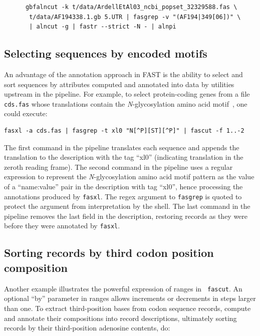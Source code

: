\documentclass{frontiersSCNS} %
\begin{document}
\begin{verbatim}
      gbfalncut -k t/data/ArdellEtAl03_ncbi_popset_32329588.fas \
       t/data/AF194338.1.gb 5.UTR | fasgrep -v "(AF194|349[06])" \
       | alncut -g | fastr --strict -N - | alnpi
\end{verbatim}

\subsection{Selecting sequences by encoded motifs }

An advantage of the annotation approach in FAST is the ability to
select and sort sequences by attributes computed and annotated into
data by utilities upstream in the pipeline. For example, to select
protein-coding genes from a file {\tt cds.fas} whose translations
contain the {\it N}-glycosylation amino acid
motif~\citep{KornfieldKornfield85}, one could execute:

\begin{verbatim}
fasxl -a cds.fas | fasgrep -t xl0 "N[^P][ST][^P]" | fascut -f 1..-2
\end{verbatim}
 
The first command in the pipeline translates each sequence and appends
the translation to the description with the tag ``xl0'' (indicating
translation in the zeroth reading frame). The second command in the
pipeline uses a regular expression to represent the {\it
  N}-glycosylation amino acid motif pattern as the value of a
``name:value'' pair in the description with tag ``xl0'', hence
processing the annotations produced by {\tt fasxl}. The regex argument
to {\tt fasgrep} is quoted to protect the argument from interpretation
by the shell. The last command in the pipeline removes the last field
in the description, restoring records as they were before they were
annotated by {\tt fasxl}.

\subsection{Sorting records by third codon position composition}

Another example illustrates the powerful expression of ranges in {\tt
  fascut}. An optional ``by'' parameter in ranges allows increments or
decrements in steps larger than one. To extract third-position bases
from codon sequence records, compute and annotate their compositions
into record descriptions, ultimately sorting records by
their third-position adenosine contents, do:
\end{document}
